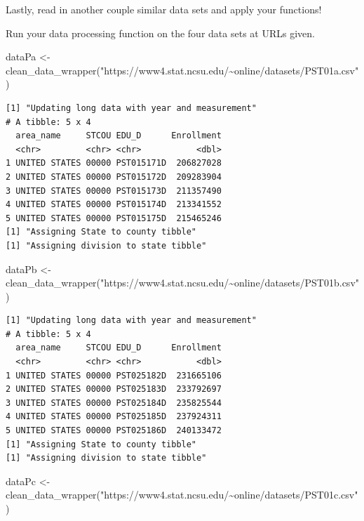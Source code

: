 \documentclass[
  letterpaper,
  DIV=11,
  numbers=noendperiod]{scrartcl}
\newenvironment{Shaded}{\begin{snugshade}}{\end{snugshade}}
\newcommand{\FunctionTok}[1]{\textcolor[rgb]{0.28,0.35,0.67}{#1}}
\newcommand{\NormalTok}[1]{\textcolor[rgb]{0.00,0.23,0.31}{#1}}
\newcommand{\OtherTok}[1]{\textcolor[rgb]{0.00,0.23,0.31}{#1}}
\newcommand{\StringTok}[1]{\textcolor[rgb]{0.13,0.47,0.30}{#1}}
\begin{document}
Lastly, read in another couple similar data sets and apply your
functions!

Run your data processing function on the four data sets at URLs given.

\begin{Shaded}
\begin{Highlighting}[]
\NormalTok{dataPa }\OtherTok{\textless{}{-}} \FunctionTok{clean\_data\_wrapper}\NormalTok{(}\StringTok{"https://www4.stat.ncsu.edu/\textasciitilde{}online/datasets/PST01a.csv"}\NormalTok{)}
\end{Highlighting}
\end{Shaded}

\begin{verbatim}
[1] "Updating long data with year and measurement"
# A tibble: 5 x 4
  area_name     STCOU EDU_D      Enrollment
  <chr>         <chr> <chr>           <dbl>
1 UNITED STATES 00000 PST015171D  206827028
2 UNITED STATES 00000 PST015172D  209283904
3 UNITED STATES 00000 PST015173D  211357490
4 UNITED STATES 00000 PST015174D  213341552
5 UNITED STATES 00000 PST015175D  215465246
[1] "Assigning State to county tibble"
[1] "Assigning division to state tibble"
\end{verbatim}

\begin{Shaded}
\begin{Highlighting}[]
\NormalTok{dataPb }\OtherTok{\textless{}{-}} \FunctionTok{clean\_data\_wrapper}\NormalTok{(}\StringTok{"https://www4.stat.ncsu.edu/\textasciitilde{}online/datasets/PST01b.csv"}\NormalTok{)}
\end{Highlighting}
\end{Shaded}

\begin{verbatim}
[1] "Updating long data with year and measurement"
# A tibble: 5 x 4
  area_name     STCOU EDU_D      Enrollment
  <chr>         <chr> <chr>           <dbl>
1 UNITED STATES 00000 PST025182D  231665106
2 UNITED STATES 00000 PST025183D  233792697
3 UNITED STATES 00000 PST025184D  235825544
4 UNITED STATES 00000 PST025185D  237924311
5 UNITED STATES 00000 PST025186D  240133472
[1] "Assigning State to county tibble"
[1] "Assigning division to state tibble"
\end{verbatim}

\begin{Shaded}
\begin{Highlighting}[]
\NormalTok{dataPc }\OtherTok{\textless{}{-}} \FunctionTok{clean\_data\_wrapper}\NormalTok{(}\StringTok{"https://www4.stat.ncsu.edu/\textasciitilde{}online/datasets/PST01c.csv"}\NormalTok{)}
\end{Highlighting}
\end{Shaded}
\end{document}
